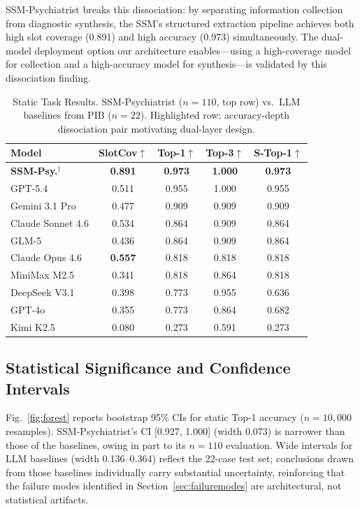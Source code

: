 \documentclass[conference]{IEEEtran}
\begin{document}
SSM-Psychiatrist breaks this dissociation: by separating information collection from diagnostic synthesis, the SSM's structured extraction pipeline achieves both high slot coverage (0.891) and high accuracy (0.973) simultaneously. The dual-model deployment option our architecture enables---using a high-coverage model for collection and a high-accuracy model for synthesis---is validated by this dissociation finding.

\begin{table}[htbp]
\caption{Static Task Results. SSM-Psychiatrist ($n=110$, top row) vs.\ LLM baselines from PIB ($n=22$). Highlighted row: accuracy-depth dissociation pair motivating dual-layer design.}
\label{tab:static}
\begin{center}
\begin{tabular}{lcccc}
\toprule
\textbf{Model} & \textbf{SlotCov$\uparrow$} & \textbf{Top-1$\uparrow$} & \textbf{Top-3$\uparrow$} & \textbf{S-Top-1$\uparrow$} \\
\midrule
\rowcolor[gray]{0.88}
\textbf{SSM-Psy.}$^\dagger$   & \textbf{0.891} & \textbf{0.973} & \textbf{1.000} & \textbf{0.973} \\
\midrule
GPT-5.4           & 0.511 & 0.955 & 1.000 & 0.955 \\
Gemini 3.1 Pro    & 0.477 & 0.909 & 0.909 & 0.909 \\
Claude Sonnet 4.6 & 0.534 & 0.864 & 0.909 & 0.864 \\
GLM-5             & 0.436 & 0.864 & 0.909 & 0.864 \\
\rowcolor[gray]{0.92}
Claude Opus 4.6   & \textbf{0.557} & 0.818 & 0.818 & 0.818 \\
MiniMax M2.5      & 0.341 & 0.818 & 0.864 & 0.818 \\
DeepSeek V3.1     & 0.398 & 0.773 & 0.955 & 0.636 \\
GPT-4o            & 0.355 & 0.773 & 0.864 & 0.682 \\
Kimi K2.5         & 0.080 & 0.273 & 0.591 & 0.273 \\
\bottomrule
\end{tabular}
\end{center}
\end{table}



\subsection{Statistical Significance and Confidence Intervals}

Fig.~\ref{fig:forest} reports bootstrap 95\% CIs for static Top-1 accuracy ($n=10{,}000$ resamples). SSM-Psychiatrist's CI [0.927, 1.000] (width 0.073) is narrower than those of the baselines, owing in part to its $n=110$ evaluation. Wide intervals for LLM baselines (width 0.136--0.364) reflect the 22-case test set; conclusions drawn from those baselines individually carry substantial uncertainty, reinforcing that the failure modes identified in Section~\ref{sec:failuremodes} are architectural, not statistical artifacts.
\end{document}
